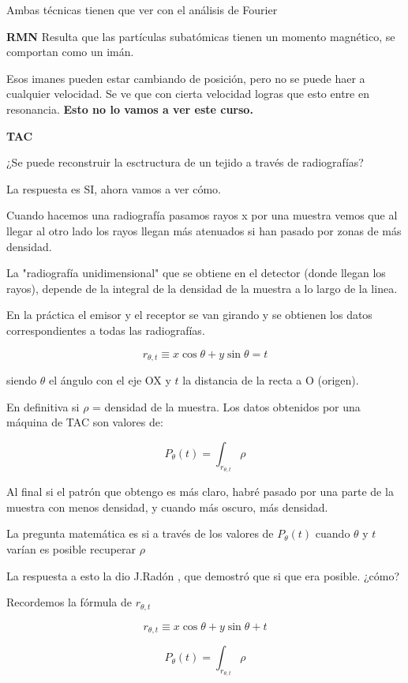	Ambas técnicas tienen que ver con el análisis de Fourier

	\textbf{RMN} Resulta que las partículas subatómicas tienen un momento magnético, se comportan como un imán.

	Esos imanes pueden estar cambiando de posición, pero no se puede haer a cualquier velocidad.
	Se ve que con cierta velocidad logras que esto entre en resonancia. \textbf{Esto no lo vamos a ver este curso.}

	\textbf{TAC}

	¿Se puede reconstruir la esctructura de un tejido a través de radiografías?

	La respuesta es SI, ahora vamos a ver cómo.


	Cuando hacemos una radiografía pasamos rayos x por una muestra vemos que al llegar al otro lado los rayos llegan más atenuados si han pasado por zonas de más densidad.

	La "radiografía unidimensional" que se obtiene en el detector (donde llegan los rayos), depende de la integral de la densidad de la muestra a lo largo de la linea.

	En la práctica el emisor y el receptor se van girando y se obtienen los datos correspondientes a todas las radiografías.

	$$r_{\theta , t} \equiv x \cos\theta + y\sin\theta = t$$


	siendo $\theta$ el ángulo con el eje OX y $t$
 la distancia de la recta a O (origen).


En definitiva si $\rho$ = densidad de la muestra. Los datos obtenidos por una máquina de TAC son valores de:

$$P_{\theta} (t) = \int_{r_{\theta , t}} \rho$$

Al final si el patrón que obtengo es más claro, habré pasado por una parte de la muestra con menos densidad, y cuando más oscuro, más densidad.

La pregunta matemática es si a través de los valores de $P_{\theta}(t)$ cuando $\theta$ y $t$ varían es posible recuperar $\rho$

La respuesta a esto la dio J.Radón , que demostró que si que era posible. ¿cómo?

Recordemos la fórmula de $r_{\theta,t}$

	$$r_{\theta , t} \equiv x \cos\theta + y\sin\theta + t$$

	$$P_{\theta} (t) = \int_{r_{\theta , t}} \rho $$

